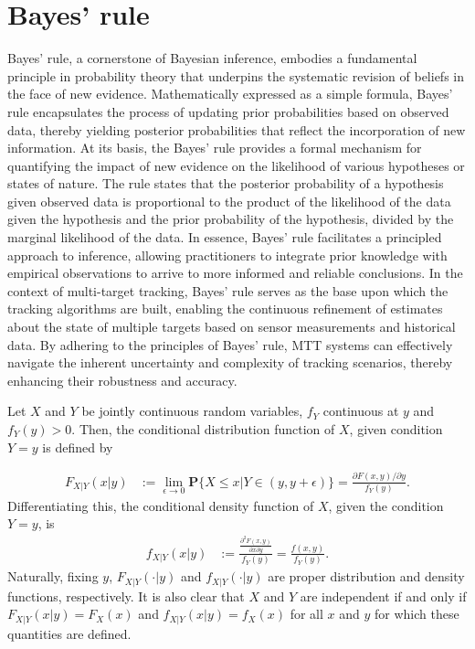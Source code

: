     \section{Bayes' rule}
Bayes' rule, a cornerstone of Bayesian inference, embodies a fundamental principle in probability theory that underpins the systematic revision of beliefs in the face of new evidence. Mathematically expressed as a simple formula, Bayes' rule encapsulates the process of updating prior probabilities based on observed data, thereby yielding posterior probabilities that reflect the incorporation of new information. At its basis, the Bayes' rule provides a formal mechanism for quantifying the impact of new evidence on the likelihood of various hypotheses or states of nature. The rule states that the posterior probability of a hypothesis given observed data is proportional to the product of the likelihood of the data given the hypothesis and the prior probability of the hypothesis, divided by the marginal likelihood of the data. In essence, Bayes' rule facilitates a principled approach to inference, allowing practitioners to integrate prior knowledge with empirical observations to arrive to more informed and reliable conclusions. In the context of multi-target tracking, Bayes' rule serves as the base upon which the tracking algorithms are built, enabling the continuous refinement of estimates about the state of multiple targets based on sensor measurements and historical data. By adhering to the principles of Bayes' rule, MTT systems can effectively navigate the inherent uncertainty and complexity of tracking scenarios, thereby enhancing their robustness and accuracy.
    \begin{definition}
    Let $X$ and $Y$ be jointly continuous random variables, $f_Y$ continuous at $y$ and $f_Y(y) > 0$. Then, the
    conditional distribution function of $X$, given condition ${Y=y}$ is defined by
    \end{definition}
    \begin{align}
        F_{X|Y}(x|y) &:= \lim_{\epsilon\to0} \textbf{P}\{X\leq x | Y \in (y, y + \epsilon)\} = \frac{\partial F(x,y) /
        \partial y}{f_Y(y)}.\label{eq:conditional_distribution}
    \end{align}
    Differentiating this, the conditional density function of $X$, given the condition ${Y = y}$, is
    \begin{align}
        f_{X|Y}(x|y) &:= \frac{ \frac{\partial^2 F(x,y)}{\partial x \partial y}}{f_Y(y)} = \frac{f(x,y)}{f_Y(y)}. \label{eq:conditional_distribution2}
    \end{align}
    Naturally, fixing $y$, $F_{X|Y}(\cdot|y)$ and $f_{X|Y}(\cdot|y)$ are proper distribution and density functions, respectively. It is also clear that $X$ and $Y$ are independent if and only if $F_{X|Y}(x|y) = F_X(x)$ and $f_{X|Y}(x|y) = f_X(x)$ for all $x$ and $y$ for which these quantities are defined.

